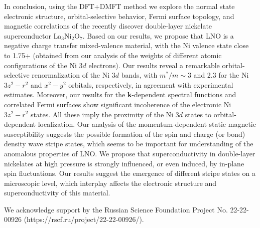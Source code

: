\documentclass[prl,twocolumn,preprintnumbers,superscriptaddress]{revtex4-1}
\begin{document}
In conclusion, using the DFT+DMFT method we explore the normal state electronic structure, orbital-selective behavior, Fermi surface topology, and magnetic correlations of the recently discover 
double-layer nickelate superconductor La$_3$Ni$_2$O$_7$. Based on our results, we propose that LNO is a negative charge transfer mixed-valence material, with the Ni 
valence state close to 1.75+ (obtained from our analysis of the weights of different atomic configurations of the Ni $3d$ electrons). Our results reveal a remarkable orbital-selective renormalization 
of the Ni $3d$ bands, with $m^*/m \sim 3$ and 2.3 for the Ni $3z^2-r^2$ and $x^2-y^2$ orbitals, respectively, in agreement with experimental estimates. 
Moreover, our results for the {\bf k}-dependent spectral functions and correlated Fermi surfaces show significant incoherence of the electronic Ni $3z^2-r^2$ states. All these imply the proximity of the Ni 
$3d$ states to orbital-dependent localization. Our analysis of the momentum-dependent static magnetic susceptibility suggests the possible formation of the spin and 
charge (or bond) density wave stripe states, which seems to be important for understanding of the anomalous properties of LNO. We propose that superconductivity in double-layer nickelates 
at high pressure is strongly influenced, or even induced, by in-plane spin fluctuations. Our results suggest the emergence of different stripe states on a microscopic level, which interplay
affects the electronic structure and superconductivity of this material.




\begin{acknowledgments}
We acknowledge support by the Russian Science Foundation Project No. 22-22-00926 (https://rscf.ru/project/22-22-00926/).

\end{acknowledgments}
\end{document}

